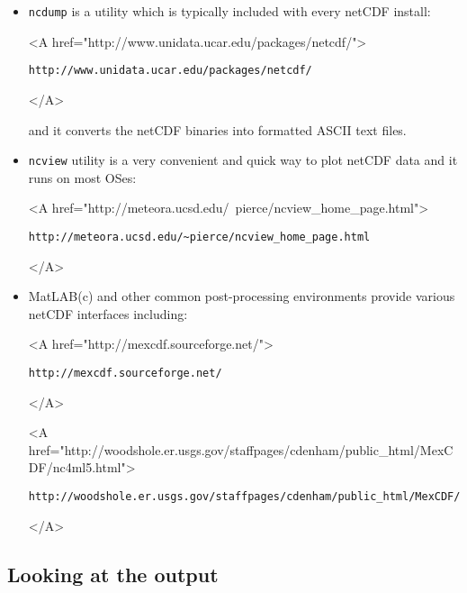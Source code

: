\begin{itemize}
\item \texttt{ncdump} is a utility which is typically included
  with every netCDF install:
  \begin{rawhtml} <A href="http://www.unidata.ucar.edu/packages/netcdf/"> \end{rawhtml}
\begin{verbatim}
http://www.unidata.ucar.edu/packages/netcdf/
\end{verbatim}
  \begin{rawhtml} </A> \end{rawhtml} and it converts the netCDF
  binaries into formatted ASCII text files.

\item \texttt{ncview} utility is a very convenient and quick way
  to plot netCDF data and it runs on most OSes:
  \begin{rawhtml} <A href="http://meteora.ucsd.edu/~pierce/ncview_home_page.html"> \end{rawhtml}
\begin{verbatim}
http://meteora.ucsd.edu/~pierce/ncview_home_page.html
\end{verbatim}
  \begin{rawhtml} </A> \end{rawhtml}
  
\item MatLAB(c) and other common post-processing environments provide
  various netCDF interfaces including:
  \begin{rawhtml} <A href="http://mexcdf.sourceforge.net/"> \end{rawhtml}
\begin{verbatim}
http://mexcdf.sourceforge.net/
\end{verbatim}
  \begin{rawhtml} </A> \end{rawhtml}
  \begin{rawhtml} <A href="http://woodshole.er.usgs.gov/staffpages/cdenham/public_html/MexCDF/nc4ml5.html"> \end{rawhtml}
\begin{verbatim}
http://woodshole.er.usgs.gov/staffpages/cdenham/public_html/MexCDF/nc4ml5.html
\end{verbatim}
  \begin{rawhtml} </A> \end{rawhtml}
\end{itemize}


\subsection{Looking at the output}


